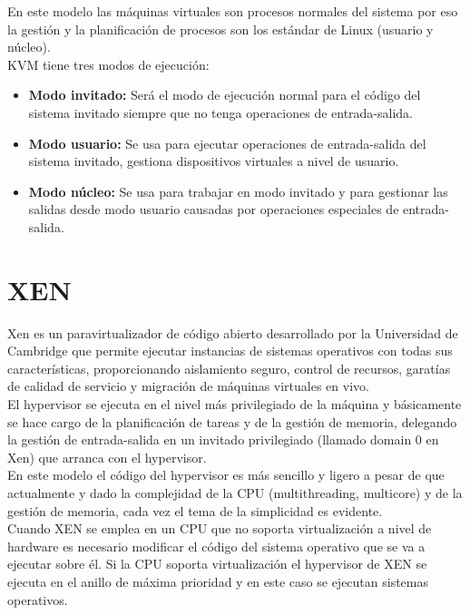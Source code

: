 \documentclass[10pt,a4paper,spanish]{report}
\begin{document}
  \noindent
  En este modelo las máquinas virtuales son procesos normales del sistema por eso la gestión y la planificación de procesos son los estándar de Linux (usuario y núcleo). \\

  \noindent
  KVM tiene tres modos de ejecución:
  \begin{itemize}
    \item \textbf{Modo invitado: } Será el modo de ejecución normal para el código del sistema invitado siempre que no tenga operaciones de entrada-salida.
    \item \textbf{Modo usuario: } Se usa para ejecutar operaciones de entrada-salida del sistema invitado, gestiona dispositivos virtuales a nivel de usuario.
    \item \textbf{Modo núcleo: } Se usa para trabajar en modo invitado y para gestionar las salidas desde modo usuario causadas por operaciones especiales de entrada-salida.
  \end{itemize}

  \section{XEN}

  \noindent
  Xen es un paravirtualizador de código abierto desarrollado por la Universidad de Cambridge que permite ejecutar instancias de sistemas operativos con todas sus características, proporcionando aislamiento seguro, control de recursos, garatías de calidad de servicio y migración de máquinas virtuales en vivo.\\

  \noindent
  El hypervisor se ejecuta en el nivel más privilegiado de la máquina y básicamente se hace cargo de la planificación de tareas y de la gestión de memoria, delegando la gestión de entrada-salida en un invitado privilegiado (llamado domain 0 en Xen) que arranca con el hypervisor.\\

  \noindent
  En este modelo el código del hypervisor es más sencillo y ligero a pesar de que actualmente y dado la complejidad de la CPU (multithreading, multicore) y de la gestión de memoria, cada vez el tema de la simplicidad es evidente.\\

  \noindent
  Cuando XEN se emplea en un CPU que no soporta virtualización a nivel de hardware es necesario modificar el código del sistema operativo que se va a ejecutar sobre él. Si la CPU soporta virtualización el hypervisor de XEN se ejecuta en el anillo de máxima prioridad y en este caso se ejecutan sistemas operativos. \\
\end{document}
